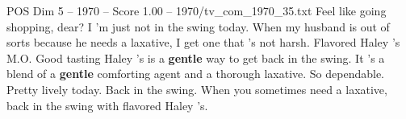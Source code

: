 \begin{textsample}{POS Dim 5 – 1970 – Score 1.00 – 1970/tv\_com\_1970\_35.txt}  \label{ex:f5_pos_058}
Feel like going shopping, dear?
I 'm just not in the swing today.
When my husband is out of sorts because he needs a laxative, I get one that 's not harsh.
Flavored Haley 's M.O.
Good tasting Haley 's is a \textbf{gentle} way to get back in the swing.
It 's a blend of a \textbf{gentle} comforting agent and a thorough laxative.
So dependable.
Pretty lively today.
Back in the swing.
When you sometimes need a laxative, back in the swing with flavored Haley 's.

\end{textsample}
